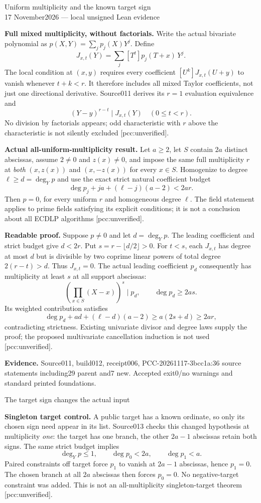 \documentclass[10pt]{article}
\begin{document}
\begin{center}{\Large Uniform multiplicity and the known target sign}\\[4pt]
17 November2026 --- local unsigned Lean evidence\end{center}
\textbf{Full mixed multiplicity, without factorials.} Write the actual
bivariate polynomial as $p(X,Y)=\sum_j p_j(X)Y^j$. Define
\[
 J_{x,t}(Y)=\sum_j [T^t]p_j(T+x)\,Y^j.
\]
The local condition at $(x,y)$ requires every coefficient
$[U^k]J_{x,t}(U+y)$ to vanish whenever $t+k<r$. It therefore includes
all mixed Taylor coefficients, not just one directional derivative.
Source011 derives its $r=1$ evaluation equivalence and
\[
 (Y-y)^{r-t}\mid J_{x,t}(Y)\quad(0\le t<r).
\]
No division by factorials appears; odd characteristic with $r$ above the
characteristic is not silently excluded [pcc:unverified].

\textbf{Actual all-uniform-multiplicity result.} Let $a\ge2$, let $S$ contain
$2a$ distinct abscissas, assume $2\ne0$ and $z(x)\ne0$, and impose the same
full multiplicity $r$ at \emph{both} $(x,z(x))$ and $(x,-z(x))$ for every
$x\in S$. Homogenize to degree $\ell\ge d=\deg_Yp$ and use the exact strict
natural coefficient budget
\[
 \deg p_j+ja+(\ell-j)(a-2)<2ar.
\]
Then $p=0$, for every uniform $r$ and homogeneous degree $\ell$. The field
statement applies to prime fields satisfying its explicit conditions; it
is not a conclusion about all ECDLP algorithms [pcc:unverified].

\textbf{Readable proof.} Suppose $p\ne0$ and let $d=\deg_Yp$.
The leading coefficient and strict budget give $d<2r$. Put
$s=r-\lfloor d/2\rfloor>0$. For $t<s$, each $J_{x,t}$ has degree at most $d$
but is divisible by two coprime linear powers of total degree $2(r-t)>d$.
Thus $J_{x,t}=0$. The actual leading coefficient $p_d$ consequently has
multiplicity at least $s$ at all support abscissas:
\[
 \left(\prod_{x\in S}(X-x)\right)^s\mid p_d,
 \qquad \deg p_d\ge2as.
\]
Its weighted contribution satisfies
\[
 \deg p_d+ad+(\ell-d)(a-2)\ge a(2s+d)\ge2ar,
\]
contradicting strictness. Existing univariate divisor and degree laws supply
the proof; the proposed multivariate cancellation induction is not used
[pcc:unverified].

\textbf{Evidence.} Source011, build012, receipt006,
PCC-20261117-3bcc1a:36 source statements including29 parent and7 new.
Accepted exit0/no warnings and standard printed foundations.
\newpage
\begin{center}{\Large The target sign changes the actual input}\end{center}
\textbf{Singleton target control.} A public target has a known ordinate,
so only its chosen sign need appear in its list. Source013 checks this changed
hypothesis at multiplicity \emph{one}: the target has one branch, the other
$2a-1$ abscissas retain both signs. The same strict budget implies
\[
 \deg_Yp\le1,\qquad \deg p_0<2a,\qquad \deg p_1<a.
\]
Paired constraints off target force $p_1$ to vanish at $2a-1$ abscissas, hence
$p_1=0$. The chosen branch at all $2a$ abscissas then forces $p_0=0$.
No negative-target constraint was added. This is not an all-multiplicity
singleton-target theorem [pcc:unverified].
\end{document}
